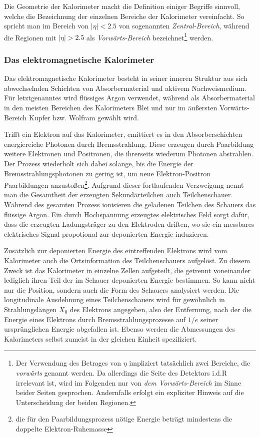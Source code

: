 Die Geometrie der Kalorimeter macht die Definition einiger Begriffe sinnvoll,
welche die Bezeichnung der einzelnen Bereiche der Kalorimeter vereinfacht. So
spricht man im Bereich von $|\eta|<2.5$ von sogenannten \emph{Zentral-Bereich},
während die Regionen mit $|\eta| > 2.5$ als \emph{Vorwärts-Bereich}
bezeichnet\footnote{Der Verwendung des Betrages von $\eta$ impliziert
tatsächlich zwei Bereiche, die \textit{vorwärts} genannt werden. Da allerdings
die Seite des Detektors i.d.R irrelevant ist, wird im Folgenden nur von 
\textit{dem Vorwärts-Bereich} im Sinne beider Seiten gesprochen. Andernfalls
erfolgt ein expliziter Hinweis auf die Unterscheidung der beiden Regionen.}
werden.

\subsubsection{Das elektromagnetische Kalorimeter}
Das elektromagnetische Kalorimeter besteht in seiner inneren Struktur aus sich
abwechselnden Schichten von Absorbermaterial und aktivem Nachweismedium. Für
letztgenanntes wird flüssiges Argon verwendet, während als Absorbermaterial in
den meisten Bereichen des Kalorimeters Blei und nur im äußersten
Vorwärts-Bereich Kupfer bzw. Wolfram gewählt wird.

Trifft ein Elektron auf das Kalorimeter, emittiert es in den Absorberschichten
energiereiche Photonen durch Bremsstrahlung. Diese erzeugen durch Paarbildung
weitere Elektronen und Positronen, die ihrerseits wiederum Photonen abstrahlen.
Der Prozess wiederholt sich dabei solange, bis die Energie der
Bremsstrahlungsphotonen zu gering ist, um neue Elektron-Positron Paarbildungen
anzustoßen\footnote{die für den Paarbildungsprozess nötige Energie beträgt
mindestens die doppelte Elektron-Ruhemasse}. Aufgrund dieser fortlaufenden
Verzweigung nennt man die Gesamtheit der erzeugten Sekundärteilchen auch
Teilchenschauer. Während des gesamten Prozess ionisieren die geladenen Teilchen
des Schauers das flüssige Argon. Ein durch Hochspannung erzeugtes elektrisches
Feld sorgt dafür, dass die erzeugten Ladungsträger zu den Elektroden driften,
wo sie ein messbares elektrisches Signal propotional zur deponierten Energie
induzieren.

Zusätzlich zur deponierten Energie des eintreffenden Elektrons wird vom
Kalorimeter auch die Ortsinformation des Teilchenschauers aufgelöst. Zu diesem
Zweck ist das Kalorimeter in einzelne Zellen aufgeteilt, die getrennt
voneinander lediglich ihren Teil der im Schauer deponierten Energie bestimmen.
So kann nicht nur die Position, sondern auch die Form des Schauers analysiert
werden. Die longitudinale Ausdehnung eines Teilchenschauers wird für gewöhnlich
in Strahlungslängen $X_0$ des Elektrons angegeben, also der Entfernung, nach
der die Energie eines Elektrons durch Bremsstrahlungsprozesse auf $1/e$ seiner
ursprünglichen Energie abgefallen ist. Ebenso werden die Abmessungen des
Kalorimeters selbst zumeist in der gleichen Einheit spezifiziert.

